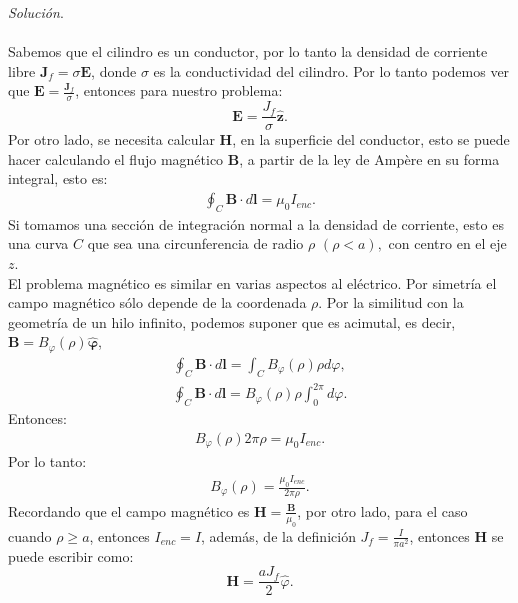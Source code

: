 \documentclass[11pt,fleqn]{book} %
\begin{document}
\begin{example}
\emph{Soluci\'on}.\\\\
Sabemos que el cilindro es un conductor, por lo tanto la densidad de corriente libre $\textbf{J}_{f}=\sigma\textbf{E}$, donde $\sigma$ es la conductividad del cilindro. Por lo tanto podemos ver que $\textbf{E}=\frac{\textbf{J}_{f}}{\sigma}$, entonces para nuestro problema:
\begin{equation}
\textbf{E}=\frac{J_{f}}{\sigma}\hat{\textbf{z}}.  \label{Campo E}
\end{equation}
Por otro lado, se necesita calcular $\textbf{H}$, en la superficie del conductor, esto se puede hacer calculando el flujo magn\'etico $\textbf{B}$, a partir de la ley de Ampère en su forma integral, esto es:
\begin{eqnarray*}
\oint_{C}\textbf{B}\cdot d\textbf{l}=\mu_{0}I_{enc}.
\end{eqnarray*}
Si tomamos una secci\'on de integraci\'on normal a la densidad de corriente, esto es una curva $C$ que sea una circunferencia de radio $\rho$ $(\rho<a),$ con centro en el eje $z$.\\
El problema magn\'etico es similar en varias aspectos al el\'ectrico. Por simetr\'ia el campo magn\'etico sólo depende de la coordenada $\rho$. Por la similitud con la geometría de un hilo infinito, podemos suponer que es acimutal, es decir, $\textbf{B}=B_{\varphi}(\rho)\hat{\mathbf{\varphi}}$,
\begin{eqnarray*}
\oint_{C}\textbf{B}\cdot d\textbf{l}=\int_{C}B_{\varphi}(\rho)\rho d\varphi,
\end{eqnarray*}
\begin{eqnarray*}
\oint_{C}\textbf{B}\cdot d\textbf{l}=B_{\varphi}(\rho)\rho\int_{0}^{2\pi} d\varphi.
\end{eqnarray*}
Entonces:
\begin{eqnarray*}
B_{\varphi}(\rho)2\pi\rho=\mu_{0}I_{enc}.
\end{eqnarray*}
Por lo tanto:
\begin{eqnarray*}
B_{\varphi}(\rho)=\frac{\mu_{0}I_{enc}}{2\pi\rho}.
\end{eqnarray*}
Recordando que el campo magn\'etico es $\textbf{H}=\frac{\textbf{B}}{\mu_{0}}$, por otro lado, para el caso cuando $\rho\geq a$, entonces $I_{enc}=I$, adem\'as, de la definici\'on $J_{f}=\frac{I}{\pi a^{2}}$, entonces $\textbf{H}$ se puede escribir como:
\begin{equation}
\textbf{H}=\frac{aJ_{f}}{2}\hat{\varphi}. \label{Campo H}
\end{equation}

\end{example}
\end{document}
